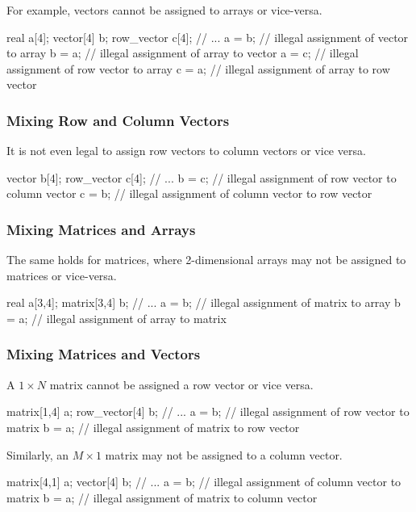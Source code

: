 For example, vectors cannot be assigned to arrays or vice-versa.
%
\begin{stancode}
real a[4];
vector[4] b;
row_vector c[4];
// ...
a = b; // illegal assignment of vector to array
b = a; // illegal assignment of array to vector
a = c; // illegal assignment of row vector to array
c = a; // illegal assignment of array to row vector
\end{stancode}

\subsubsection{Mixing Row and Column Vectors}

It is not even legal to assign row vectors to column vectors or vice
versa.
\begin{stancode}
vector b[4];
row_vector c[4];
// ...
b = c; // illegal assignment of row vector to column vector
c = b; // illegal assignment of column vector to row vector
\end{stancode}
%

\subsubsection{Mixing Matrices and Arrays}

The same holds for matrices, where 2-dimensional arrays may not be
assigned to matrices or vice-versa.

\begin{stancode}
real a[3,4];
matrix[3,4] b;
// ...
a = b;  // illegal assignment of matrix to array
b = a;  // illegal assignment of array to matrix
\end{stancode}
%

\subsubsection{Mixing Matrices and Vectors}

A $1 \times N$ matrix cannot be assigned a row vector or
vice versa.
%
\begin{stancode}
matrix[1,4] a;
row_vector[4] b;
// ...
a = b;  // illegal assignment of row vector to matrix
b = a;  // illegal assignment of matrix to row vector
\end{stancode}
%
Similarly, an $M \times 1$ matrix may not be assigned to a column vector.
%
\begin{stancode}
matrix[4,1] a;
vector[4] b;
// ...
a = b;  // illegal assignment of column vector to matrix
b = a;  // illegal assignment of matrix to column vector
\end{stancode}

